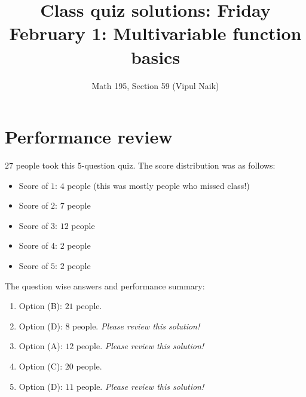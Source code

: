 \documentclass[10pt]{amsart}
\title{Class quiz solutions: Friday February 1:  Multivariable function basics}
\author{Math 195, Section 59 (Vipul Naik)}
\begin{document}
\maketitle

\section{Performance review}

$27$ people took this $5$-question quiz. The score distribution was as
follows:

\begin{itemize}
\item Score of $1$: $4$ people (this was mostly people who missed class!)
\item Score of $2$: $7$ people
\item Score of $3$: $12$ people
\item Score of $4$: $2$ people
\item Score of $5$: $2$ people
\end{itemize}

The question wise answers and performance summary:

\begin{enumerate}
\item Option (B): $21$ people.
\item Option (D): $8$ people. {\em Please review this solution!}
\item Option (A): $12$ people. {\em Please review this solution!}
\item Option (C): $20$ people.
\item Option (D): $11$ people. {\em Please review this solution!}
\end{enumerate}
\end{document}
